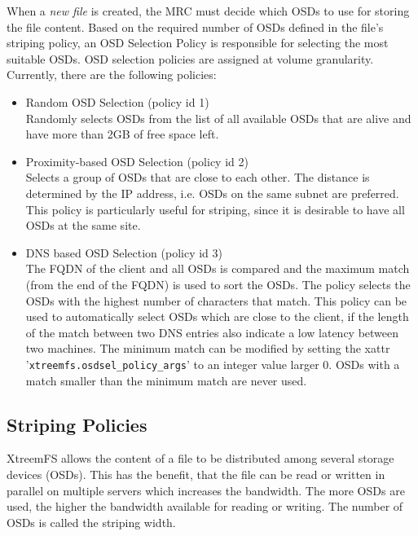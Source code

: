 \documentclass[a4paper,10pt]{book}
\begin{document}
When a \emph{new file} is created, the MRC must decide which OSDs to use for storing the file content. Based on the required number of OSDs defined in the file's striping policy, an OSD Selection Policy is responsible for selecting the most suitable OSDs. OSD selection policies are assigned at volume granularity. Currently, there are the following policies:

\begin{itemize}
 \item Random OSD Selection (policy id 1)\\
 Randomly selects OSDs from the list of all available OSDs that are alive and have more than 2GB of free space left.
 \item Proximity-based OSD Selection (policy id 2)\\
 Selects a group of OSDs that are close to each other. The distance is determined by the IP address, i.e. OSDs on the same subnet are preferred. This policy is particularly useful for striping, since it is desirable to have all OSDs at the same site.
 \item DNS based OSD Selection (policy id 3)\\
 The FQDN of the client and all OSDs is compared and the maximum match (from the end of the FQDN) is used to sort the OSDs. The policy selects the OSDs with the highest number of characters that match. This policy can be used to automatically select OSDs which are close to the client, if the length of the match between two DNS entries also indicate a low latency between two machines. The minimum match can be modified by setting the xattr '\texttt{xtreemfs.osdsel\_policy\_args}' to an integer value larger 0. OSDs with a match smaller than the minimum match are never used.
\end{itemize}


\subsection{Striping Policies} \label{sec:striping_policies}

XtreemFS allows the content of a file to be distributed among several storage devices (OSDs). This has the benefit, that the file can be read or written in parallel on multiple servers which increases the bandwidth. The more OSDs are used, the higher the bandwidth available for reading or writing. The number of OSDs is called the striping width.
\end{document}
